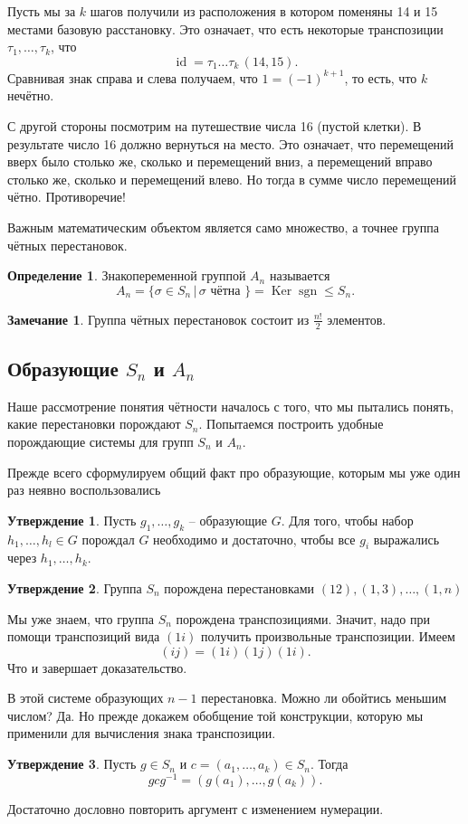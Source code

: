 \documentclass[10pt,a4paper,oneside]{book}
\theoremstyle{definition}
\newtheorem*{rem}{\color{green!50!blue}Замечание}
\newtheorem*{defn}{\color{yellow!30!red} Определение}
\newtheorem{utvr}{\color{blue!50!black}Утверждение}
\renewcommand{\leq}{\leqslant}
\newcommand{\id}{\operatorname{id}}
\DeclareMathOperator{\Ker}{Ker}
\newcommand{\sgn}{\operatorname{sgn}}
\def\dfn{\begin{defn}}
\def\edfn{\end{defn}}
\def\rm{\begin{rem}}
\def\erm{\end{rem}}
\def\utv{\begin{utvr}}
\def\eutv{\end{utvr}}
\begin{document}
Пусть мы за $k$ шагов получили из расположения в котором поменяны 14 и 15 местами базовую расстановку. Это означает, что есть некоторые транспозиции $\tau_1,\dots, \tau_k$, что 
$$\id= \tau_1\dots \tau_k\,(14,15).$$
Сравнивая знак справа и слева получаем, что $1=(-1)^{k+1}$, то есть, что $k$ нечётно.

С другой стороны посмотрим на путешествие числа 16 (пустой клетки). В результате число 16 должно вернуться на место. Это означает, что перемещений вверх было столько же, сколько и перемещений вниз, а перемещений вправо столько же, сколько и перемещений влево. Но тогда в сумме число перемещений чётно. Противоречие!


Важным математическим объектом является само множество, а точнее группа чётных перестановок.

\dfn Знакопеременной группой $A_n$ называется
$$A_n=\{\sigma \in S_n\,|\, \sigma \text{ чётна } \} = \Ker \sgn \leq S_n.$$
\edfn

\rm Группа чётных перестановок состоит из $\frac{n!}{2}$ элементов.
\erm

\subsection{Образующие $S_n$ и $A_n$}

Наше рассмотрение понятия чётности началось с того, что мы пытались понять, какие перестановки порождают $S_n$. Попытаемся построить удобные порождающие системы для групп $S_n$ и $A_n$.

Прежде всего сформулируем общий факт про образующие, которым мы уже один раз неявно воспользовались

\utv Пусть $g_1,\dots,g_k $ -- образующие $G$. Для того, чтобы набор $h_1,\dots,h_l\in G$ порождал  $G$ необходимо и достаточно, чтобы все $g_i$ выражались через $h_1,\dots,h_k$. 
\eutv

\utv Группа $S_n$ порождена перестановками $(12), (1,3),\dots, (1,n)$
\eutv
\proof Мы уже знаем, что группа $S_n$ порождена транспозициями. Значит, надо при помощи транспозиций вида $(1i)$ получить произвольные транспозиции.  Имеем
$$(ij)=(1i)(1j)(1i).$$
Что и завершает доказательство.
\endproof

В этой системе образующих $n-1$ перестановка. Можно ли обойтись меньшим числом? Да. Но прежде докажем обобщение той конструкции, которую мы применили для вычисления знака транспозиции.

\utv Пусть $g\in S_n$ и $c=(a_1,\dots,a_k)\in S_n$. Тогда 
$$gcg^{-1}=(g(a_1),\dots,g(a_k)).$$
\eutv
\proof Достаточно дословно повторить аргумент с изменением нумерации.
\endproof
\end{document}
